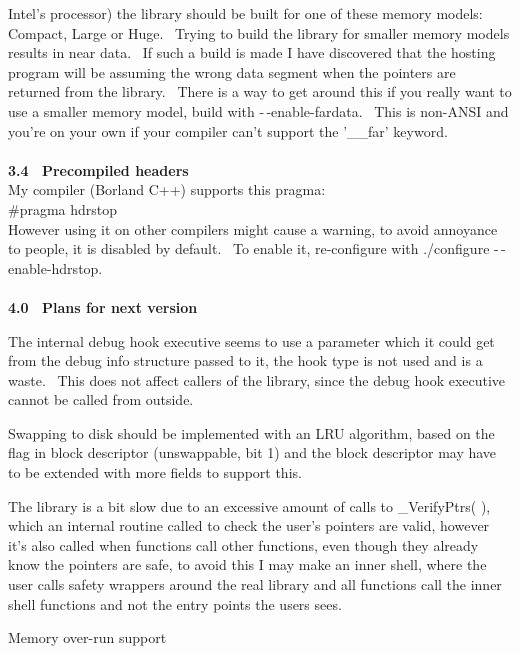 \documentclass{article}
\begin{document}
Intel's
processor) the library should be built for one of these memory models:
Compact, Large or Huge.~ Trying to build the library for smaller
memory
models results in near data.~ If such a build is made I have
discovered
that the hosting program will be assuming the wrong data segment when
the
pointers are returned from the library.~ There is a way to get
around
this if you really want to use a smaller memory model, build with
-$\,$-enable-fardata.~ This is non-ANSI and you're on your own if your
compiler can't support the '\_\_far' keyword.\\
\\
\textbf{3.4~ Precompiled headers}
\\
My compiler (Borland C++) supports this pragma:
\\
\#pragma hdrstop
\\
However using it on other compilers might cause a warning, to avoid
annoyance to people, it is disabled by default.~ To enable it,
re-configure with ./configure -$\,$-enable-hdrstop.\\
\\
\textbf{4.0~ Plans for next version}

\par The internal debug hook executive seems to use a parameter which it
could get from the debug info structure passed to it, the hook type is
not used and is a waste.~ This does not affect callers of the
library,
since the debug hook executive cannot be called from outside.
\\

\par Swapping to disk should be implemented with an LRU algorithm, based
on the flag in block descriptor (unswappable, bit 1) and the block
descriptor
may have to be extended with more fields to support this.
\\

\par The library is a bit slow due to an excessive amount of calls to
\_VerifyPtrs(
), which an internal routine called to check the user's pointers are
valid,
however it's also called when functions call other functions, even
though
they already know the pointers are safe, to avoid this I may make an
inner
shell, where the user calls safety wrappers around the real library and
all functions call the inner shell functions and not the entry points
the
users sees.
\\

\par Memory over-run support
\\
\end{document}
